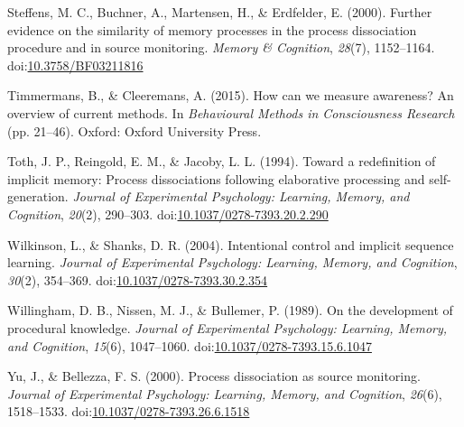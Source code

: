 \documentclass[floatsintext,doc]{apa6}
\theoremstyle{definition}
\theoremstyle{definition}
\theoremstyle{definition}
\theoremstyle{remark}
\begin{document}
\hypertarget{ref-steffens_further_2000}{}
Steffens, M. C., Buchner, A., Martensen, H., \& Erdfelder, E. (2000).
Further evidence on the similarity of memory processes in the process
dissociation procedure and in source monitoring. \emph{Memory \&
Cognition}, \emph{28}(7), 1152--1164.
doi:\href{https://doi.org/10.3758/BF03211816}{10.3758/BF03211816}

\hypertarget{ref-timmermans_how_2015}{}
Timmermans, B., \& Cleeremans, A. (2015). How can we measure awareness?
An overview of current methods. In \emph{Behavioural Methods in
Consciousness Research} (pp. 21--46). Oxford: Oxford University Press.

\hypertarget{ref-toth_toward_1994}{}
Toth, J. P., Reingold, E. M., \& Jacoby, L. L. (1994). Toward a
redefinition of implicit memory: Process dissociations following
elaborative processing and self-generation. \emph{Journal of
Experimental Psychology: Learning, Memory, and Cognition}, \emph{20}(2),
290--303.
doi:\href{https://doi.org/10.1037/0278-7393.20.2.290}{10.1037/0278-7393.20.2.290}

\hypertarget{ref-wilkinson_intentional_2004}{}
Wilkinson, L., \& Shanks, D. R. (2004). Intentional control and implicit
sequence learning. \emph{Journal of Experimental Psychology: Learning,
Memory, and Cognition}, \emph{30}(2), 354--369.
doi:\href{https://doi.org/10.1037/0278-7393.30.2.354}{10.1037/0278-7393.30.2.354}

\hypertarget{ref-willingham_development_1989}{}
Willingham, D. B., Nissen, M. J., \& Bullemer, P. (1989). On the
development of procedural knowledge. \emph{Journal of Experimental
Psychology: Learning, Memory, and Cognition}, \emph{15}(6), 1047--1060.
doi:\href{https://doi.org/10.1037/0278-7393.15.6.1047}{10.1037/0278-7393.15.6.1047}

\hypertarget{ref-yu_process_2000}{}
Yu, J., \& Bellezza, F. S. (2000). Process dissociation as source
monitoring. \emph{Journal of Experimental Psychology: Learning, Memory,
and Cognition}, \emph{26}(6), 1518--1533.
doi:\href{https://doi.org/10.1037/0278-7393.26.6.1518}{10.1037/0278-7393.26.6.1518}





  \clearpage
  
  
  
\end{document}
